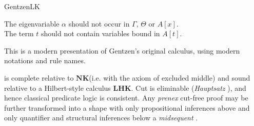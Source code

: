 \begin{entry}{GentzenLK}
\begin{calculus}
\centering
The eigenvariable $\alpha$ should not occur in $\Gamma$, $\Theta$ or $A[x]$. \\ 
The term $t$ should not contain variables bound in $A[t]$.
\end{calculus}


\begin{history}
This is a modern presentation of Gentzen's original \LK calculus\cite{lk:Gentzen1935}, using modern notations and rule names.
\end{history}

\newcommand{\LHK}{\ensuremath{\mathbf{LHK}}\xspace}
\newcommand{\NK}{\ensuremath{\mathbf{NK}}\xspace}


\begin{technicalities}
\LK is complete relative to \NK (i.e. \NJ {} with the axiom of excluded middle) and sound relative to a Hilbert-style calculus \LHK \cite{lk:Gentzen1935a}. Cut is eliminable (\emph{Hauptsatz} \cite{lk:Gentzen1935}), and hence classical predicate logic is consistent. Any \emph{prenex} cut-free proof may be further transformed into a shape with only propositional inferences above and only quantifier and structural inferences below a \emph{midsequent} \cite{lk:Gentzen1935a}.
\end{technicalities}

\end{entry}

